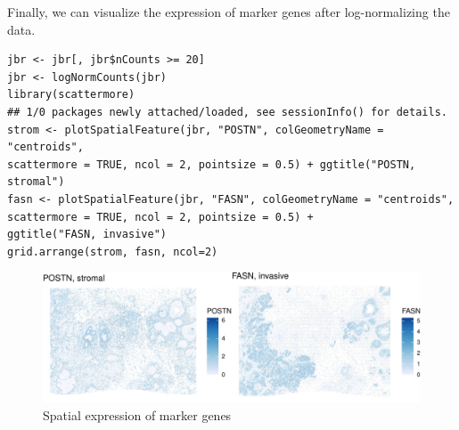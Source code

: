 Finally, we can visualize the expression of marker genes after log-normalizing
the data.

\begin{shaded}
\begin{verbatim}
jbr <- jbr[, jbr$nCounts >= 20]
jbr <- logNormCounts(jbr)
library(scattermore)
## 1/0 packages newly attached/loaded, see sessionInfo() for details.
strom <- plotSpatialFeature(jbr, "POSTN", colGeometryName = "centroids",
scattermore = TRUE, ncol = 2, pointsize = 0.5) + ggtitle("POSTN, stromal")
fasn <- plotSpatialFeature(jbr, "FASN", colGeometryName = "centroids",
scattermore = TRUE, ncol = 2, pointsize = 0.5) +
ggtitle("FASN, invasive")
grid.arrange(strom, fasn, ncol=2)
\end{verbatim}
\end{shaded}

%
%

\begin{figure}
\includegraphics[width=1\linewidth,]{spatpdfs/sfemark-1} \caption{Spatial expression of marker genes}\label{fig:sfemark}
\end{figure}

